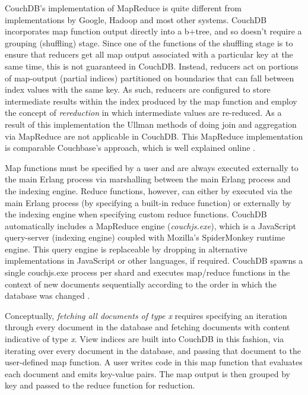 CouchDB's implementation of MapReduce is quite different from implementations by Google, Hadoop and most other systems. CouchDB incorporates map function output directly into a b+tree, and so doesn't require a grouping (shuffling) stage. Since one of the functions of the shuffling stage is to ensure that reducers get all map output associated with a particular key at the same time, this is not guaranteed in CouchDB. Instead, reducers act on portions of map-output (partial indices) partitioned on boundaries that can fall between index values with the same key. As such, reducers are configured to store intermediate results within the index produced by the map function and employ the concept of \textit{rereduction} in which intermediate values are re-reduced. As a result of this implementation the Ullman methods of doing join and aggregation via MapReduce are not applicable in CouchDB. This MapReduce implementation is comparable Couchbase's approach, which is well explained online \cite{couchbaseRereduce}.

Map functions must be specified by a user and are always executed externally to the main Erlang process via marshalling between the main Erlang process and the indexing engine. Reduce functions, however, can either by executed via the main Erlang process (by specifying a built-in reduce function) or externally by the indexing engine when specifying custom reduce functions. CouchDB automatically includes a MapReduce engine (\textit{couchjs.exe}), which is a JavaScript query-server (indexing engine) coupled with Mozilla's SpiderMonkey runtime engine. This query engine is replaceable by dropping in alternative implementations in JavaScript or other languages, if required. CouchDB spawns a single couchjs.exe process per shard and executes map/reduce functions in the context of new documents sequentially according to the order in which the database was changed \cite{slack2Nov,slack7Nov}.

Conceptually, \textit{fetching all documents of type x} requires specifying an iteration through every document in the database and fetching documents with content indicative of type \textit{x}. View indices are built into CouchDB in this fashion, via iterating over every document in the database, and passing that document to the user-defined map function. A user writes code in this map function that evaluates each document and emits key-value pairs. The map output is then grouped by key and passed to the reduce function for reduction.

